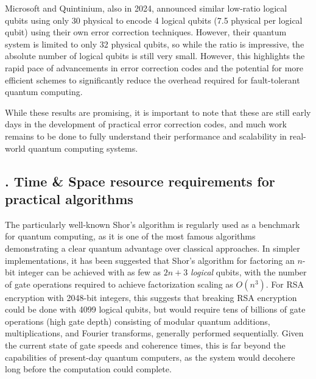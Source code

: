\documentclass{elbioimp2}
\begin{document}
Microsoft and Quintinium, also in 2024, announced similar low-ratio logical qubits using only 30 physical to encode 4 logical qubits (7.5 physical per logical qubit) using their own error correction techniques. However, their quantum system is limited to only 32 physical qubits, so while the ratio is impressive, the absolute number of logical qubits is still very small\cite{paetznick2024demonstrationlogicalqubitsrepeated}. However, this highlights the rapid pace of advancements in error correction codes and the potential for more efficient schemes to significantly reduce the overhead required for fault-tolerant quantum computing.

While these results are promising, it is important to note that these are still early days in the development of practical error correction codes, and much work remains to be done to fully understand their performance and scalability in real-world quantum computing systems.

\subsection{. Time \& Space resource requirements for practical algorithms}

The particularly well-known Shor’s algorithm is regularly used as a benchmark for quantum computing, as it is one of the most famous algorithms demonstrating a clear quantum advantage over classical approaches. In simpler implementations, it has been suggested that Shor's algorithm for factoring an $n$-bit integer can be achieved with as few as $2n+3$ \textit{logical} qubits, with the number of gate operations required to achieve factorization scaling as $O(n^3)$\cite{beauregard2003circuitshorsalgorithmusing}. For RSA encryption with 2048-bit integers, this suggests that breaking RSA encryption could be done with 4099 logical qubits, but would require tens of billions of gate operations (high gate depth) consisting of modular quantum additions, multiplications, and Fourier transforms, generally performed sequentially. Given the current state of gate speeds and coherence times, this is far beyond the capabilities of present-day quantum computers, as the system would decohere long before the computation could complete.
\end{document}

